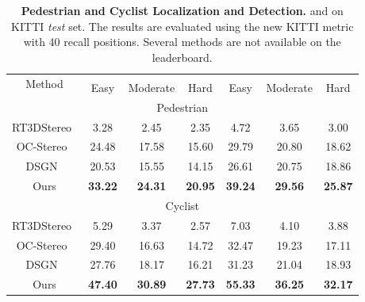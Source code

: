 \documentclass[letterpaper, 10 pt, conference]{ieeeconf}
\begin{document}
\begin{table*}
	\small
	\centering
	
	\begin{tabular}{|c||ccc||ccc|}
		\hline
		\multirow{2}{*}{Method} & \multicolumn{3}{c||}{} & \multicolumn{3}{c|}{} \\
		            &    Easy & Moderate &  Hard &  Easy & Moderate &  Hard \\ \hline
		\multicolumn{7}{|c|}{Pedestrian}\\\hline
		RT3DStereo~\cite{konigshof2019realtime} & 3.28 & 2.45 & 2.35 & 4.72 & 3.65 & 3.00
		\\ \hline
		OC-Stereo~\cite{pon2019object} & 24.48 & 17.58 &15.60 & 29.79 & 20.80 & 18.62 \\
			\hline
		DSGN~\cite{chen2020dsgn} &20.53 & 15.55 & 14.15 & 26.61 & 20.75& 18.86\\
		\hline
		Ours   & \textbf{33.22} & \textbf{24.31} & \textbf{20.95} & \textbf{39.24}  & \textbf{29.56} & \textbf{25.87} \\ \hline	\multicolumn{7}{|c|}{Cyclist}\\\hline
		RT3DStereo~\cite{konigshof2019realtime} & 5.29 & 3.37 & 2.57 & 7.03 & 4.10 & 3.88
		\\ \hline
		OC-Stereo~\cite{pon2019object} & 29.40 & 16.63 & 14.72 & 32.47 & 19.23 & 17.11 \\
		\hline
		DSGN~\cite{chen2020dsgn} &27.76 & 18.17 &16.21 & 31.23 & 21.04& 18.93\\
		\hline
		Ours   & \textbf{47.40} & \textbf{30.89} & \textbf{27.73} & \textbf{55.33} & \textbf{36.25} & \textbf{32.17} \\ \hline	
	\end{tabular}
	\caption{\textbf{Pedestrian and Cyclist Localization and Detection.} \emph{} and \emph{} on KITTI \emph{test} set.  The results are evaluated using the new KITTI metric with 40 recall positions.  Several methods are not available on the leaderboard.}
	\label{tab:kitti_test_people}
\end{table*}
\end{document}
